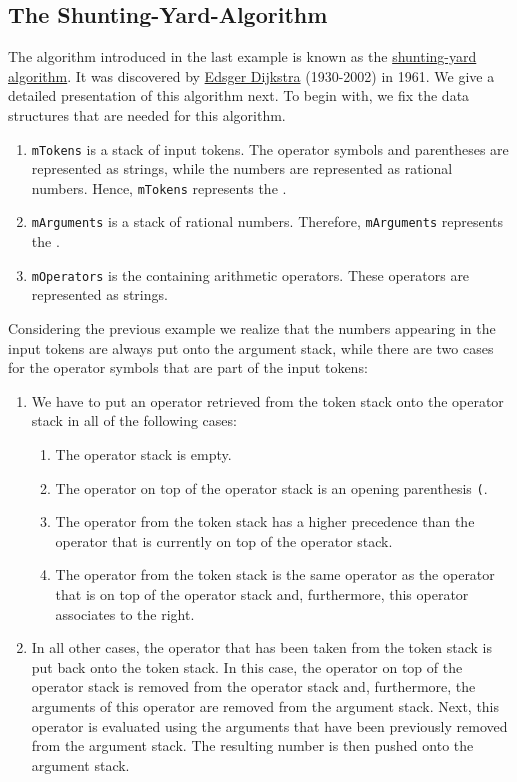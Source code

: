 \subsection{The Shunting-Yard-Algorithm \label{algo-arith}}
The algorithm introduced in the last example is known as the 
\href{http://en.wikipedia.org/wiki/Shunting-yard_algorithm}{shunting-yard algorithm}.
It was discovered by  \href{http://en.wikipedia.org/wiki/Edsger_Dijkstra}{Edsger Dijkstra} (1930-2002) in
1961.  We give a detailed presentation of this algorithm next.  To begin with, we fix the data structures
that are needed for this algorithm.
\begin{enumerate}
\item \texttt{mTokens} is a stack of input tokens.  The operator symbols and parentheses are
      represented as strings, while the numbers are represented as rational numbers.  Hence, \texttt{mTokens}
      represents the .
\item \texttt{mArguments} is a stack of rational numbers.  Therefore, \texttt{mArguments} represents the
      .
\item \texttt{mOperators} is the  containing arithmetic operators.  These operators
      are represented as strings.
\end{enumerate}
Considering the previous example we realize that the numbers appearing in the input tokens are always put onto the argument stack,
while there are two cases for the operator symbols that are part of the input tokens:
\begin{enumerate}
\item We have to put an operator retrieved from the token stack onto the operator stack in all of the following cases:
      \begin{enumerate}
      \item The operator stack is empty.
      \item The operator on top of the operator stack is an opening parenthesis \texttt{(}. 
      \item The operator from the token stack has a higher precedence than the operator that is currently on top of the
            operator stack.
      \item The operator from the token stack is the same operator as the operator that is on top of the operator stack and, furthermore,
            this operator associates to the right.
      \end{enumerate}
\item In all other cases, the operator that has been taken from the token stack is put back onto the
      token stack.  In this case, the operator on top of the operator stack is removed from the
      operator stack and, furthermore, the arguments of this operator are removed from the argument
      stack.  Next, this operator is evaluated using the arguments that have been previously removed
      from the argument stack.   The resulting number is then pushed onto the argument stack.
\end{enumerate}


